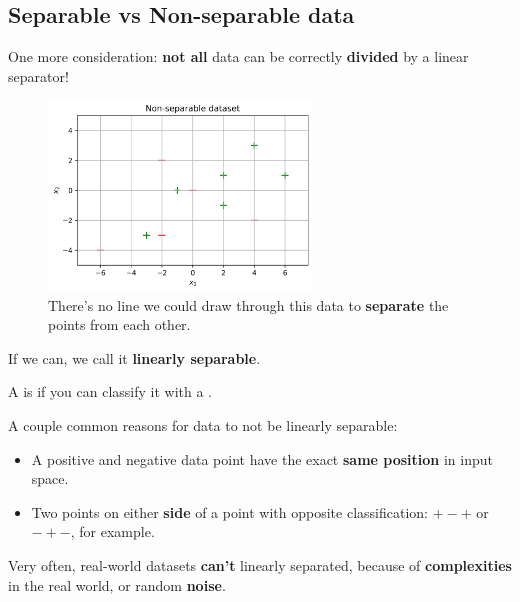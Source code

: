 
    \subsection*{Separable vs Non-separable data}
    
        One more consideration: \textbf{not all} data can be correctly \textbf{divided} by a linear separator!
        
        \begin{figure}[H]
            \centering
            
            \includegraphics[width=70mm,scale=0.5]{images/classification_images/non_separable_dataset.png}
            \caption*{There's no line we could draw through this data to \textbf{separate} the points from each other.}
        \end{figure}
            
        If we can, we call it \textbf{linearly separable}.\\
        
        \begin{definition}
            A  is  if you can  classify it with a .
        \end{definition}
        
        A couple common reasons for data to not be linearly separable:
        
        \begin{itemize}
            \item A positive and negative data point have the exact\textbf{ same position} in input space.
            
            \item Two points on either \textbf{side} of a point with opposite classification: $+-+$ or $-+-$, for example.
        \end{itemize}
        
        Very often, real-world datasets \textbf{can't} linearly separated, because of \textbf{complexities} in the real world, or random \textbf{noise}.
        
